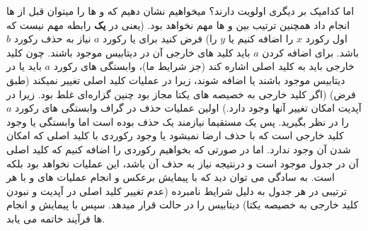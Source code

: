 \documentclass{article}
\begin{document}
    اما کدامیک بر دیگری اولویت دارند؟ میخواهیم نشان دهیم که 
    و
    ها را میتوان  قبل از  ها انجام داد همچنین ترتیب بین  و  ها مهم نخواهد بود. (یعنی در \textbf{یک} رابطه مهم نیست که اول رکورد $x$ را اضافه کنیم یا $y$ را) فرض کنید برای  یا  رکورد $a$ نیاز به حذف رکورد $b$ باشد. برای اضافه کردن $a$ باید کلید های خارجی آن در دیتابیس موجود باشند. چون کلید خارجی باید به کلید اصلی اشاره کند (جز شرایط ما)، وابستگی های رکورد $a$ باید یا در دیتابیس موجود باشند یا اضافه شوند، زیرا در عملیات  کلید اصلی تغییر نمیکند‌ (طبق فرض)‌ (اگر کلید خارجی به خصیصه های یکتا مجاز بود چنین گزاره‌ای غلط بود. زیرا در آپدیت امکان تغییر آنها وجود دارد.) اولین عملیات حذف در گراف وابستگی های رکورد $a$ را در نظر بگیرید. پس یک 
    مستقیما نیازمند یک حذف بوده است اما وابستگی یا وجود کلید خارجی است که با حذف ارضا نمیشود یا وجود رکوردی با کلید اصلی که امکان 
    شدن آن وجود ندارد. اما در صورتی که بخواهیم رکوردی را اضافه کنیم که کلید اصلی آن در جدول موجود است و درنتیجه نیاز به حذف آن باشد،‌ این عملیات 
    نخواهد بود بلکه  است. به سادگی می توان دید که با پیمایش برعکس 
    و انجام عملیات های  و  با هر ترتیبی در هر جدول به دلیل شرایط نامبرده (عدم تغییر کلید اصلی در آپدیت و نبودن کلید خارجی به خصیصه یکتا) دیتابیس را در حالت 
    قرار میدهد. سپس با پیمایش 
    و انجام  ها فرآیند 
    خاتمه می یابد.
    
\end{document}
